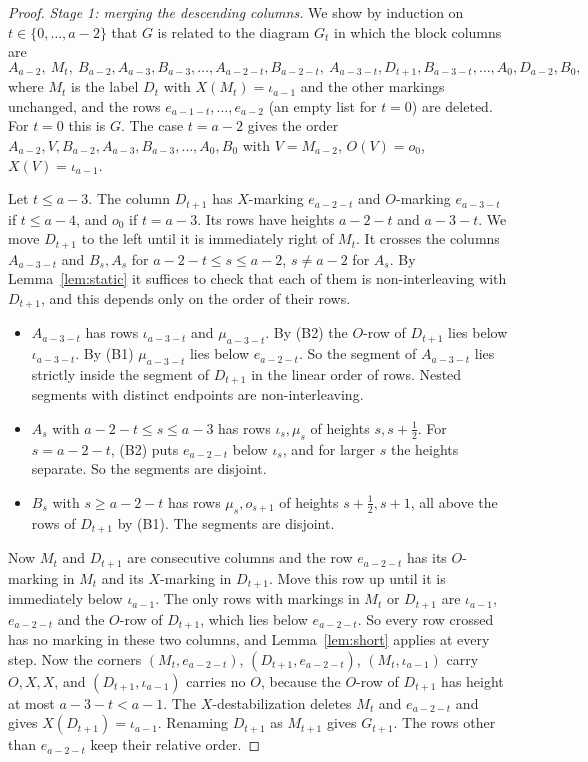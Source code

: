 \documentclass[11pt]{amsart}
\theoremstyle{definition}
\theoremstyle{remark}
\begin{document}
\begin{proof}
\emph{Stage 1: merging the descending columns.} We show by induction on $t\in\{0,\dots,a-2\}$ that
$G$ is related to the diagram $G_t$ in which the block columns are
\[
A_{a-2},\ M_t,\ B_{a-2},A_{a-3},B_{a-3},\dots,A_{a-2-t},B_{a-2-t},\ A_{a-3-t},D_{t+1},B_{a-3-t},\dots,
A_0,D_{a-2},B_0,
\]
where $M_t$ is the label $D_t$ with $X(M_t)=\iota_{a-1}$ and the other markings unchanged, and the
rows $e_{a-1-t},\dots,e_{a-2}$ (an empty list for $t=0$) are deleted. For $t=0$ this is $G$. The
case $t=a-2$ gives the order $A_{a-2},V,B_{a-2},A_{a-3},B_{a-3},\dots,A_0,B_0$ with $V=M_{a-2}$,
$O(V)=o_0$, $X(V)=\iota_{a-1}$.

Let $t\le a-3$. The column $D_{t+1}$ has $X$-marking $e_{a-2-t}$ and $O$-marking $e_{a-3-t}$ if
$t\le a-4$, and $o_0$ if $t=a-3$. Its rows have heights $a-2-t$ and $a-3-t$. We move $D_{t+1}$ to the
left until it is immediately right of $M_t$. It crosses the columns $A_{a-3-t}$ and $B_s,A_s$ for
$a-2-t\le s\le a-2$, $s\ne a-2$ for $A_s$. By Lemma~\ref{lem:static} it suffices to check that each of them is
non-interleaving with $D_{t+1}$, and this depends only on the order of their rows.
\begin{itemize}
\item $A_{a-3-t}$ has rows $\iota_{a-3-t}$ and $\mu_{a-3-t}$. By (B2) the $O$-row of $D_{t+1}$ lies
below $\iota_{a-3-t}$. By (B1) $\mu_{a-3-t}$ lies below $e_{a-2-t}$. So the segment of $A_{a-3-t}$
lies strictly inside the segment of $D_{t+1}$ in the linear order of rows. Nested segments with
distinct endpoints are non-interleaving.
\item $A_s$ with $a-2-t\le s\le a-3$ has rows $\iota_s,\mu_s$ of heights $s,s+\frac12$. For
$s=a-2-t$, (B2) puts $e_{a-2-t}$ below $\iota_s$, and for larger $s$ the heights separate. So the
segments are disjoint.
\item $B_s$ with $s\ge a-2-t$ has rows $\mu_s,o_{s+1}$ of heights $s+\frac12,s+1$, all above the rows
of $D_{t+1}$ by (B1). The segments are disjoint.
\end{itemize}
Now $M_t$ and $D_{t+1}$ are consecutive columns and the row $e_{a-2-t}$ has its $O$-marking in $M_t$
and its $X$-marking in $D_{t+1}$. Move this row up until it is immediately below $\iota_{a-1}$. The
only rows with markings in $M_t$ or $D_{t+1}$ are $\iota_{a-1}$, $e_{a-2-t}$ and the $O$-row of
$D_{t+1}$, which lies below $e_{a-2-t}$. So every row crossed has no marking in these two columns,
and Lemma~\ref{lem:short} applies at every step. Now the corners $(M_t,e_{a-2-t})$,
$(D_{t+1},e_{a-2-t})$, $(M_t,\iota_{a-1})$ carry $O,X,X$, and $(D_{t+1},\iota_{a-1})$ carries no
$O$, because the $O$-row of $D_{t+1}$ has height at most $a-3-t<a-1$. The $X$-destabilization
deletes $M_t$ and $e_{a-2-t}$ and gives $X(D_{t+1})=\iota_{a-1}$. Renaming $D_{t+1}$ as $M_{t+1}$
gives $G_{t+1}$. The rows other than $e_{a-2-t}$ keep their relative order.


\end{proof}
\end{document}
